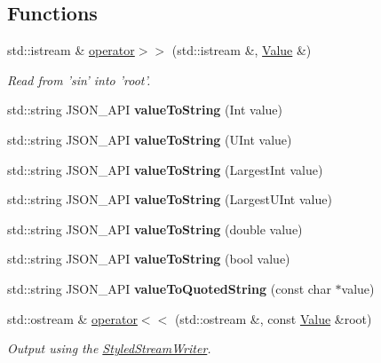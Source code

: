 \subsection*{Functions}
\begin{DoxyCompactItemize}
\item 
std\-::istream \& \hyperlink{namespace_json_a4d245ef719cc0853e8e78eb5f99c16e5}{operator$>$$>$} (std\-::istream \&, \hyperlink{class_json_1_1_value}{Value} \&)
\begin{DoxyCompactList}\small\item\em Read from 'sin' into 'root'. \end{DoxyCompactList}\item 
\hypertarget{namespace_json_a05cd078d8e086a4bcc08d40948f711e7}{std\-::string J\-S\-O\-N\-\_\-\-A\-P\-I {\bfseries value\-To\-String} (Int value)}\label{namespace_json_a05cd078d8e086a4bcc08d40948f711e7}

\item 
\hypertarget{namespace_json_abcb58ea0f384c30608729a94d539e2ce}{std\-::string J\-S\-O\-N\-\_\-\-A\-P\-I {\bfseries value\-To\-String} (U\-Int value)}\label{namespace_json_abcb58ea0f384c30608729a94d539e2ce}

\item 
\hypertarget{namespace_json_abd9c650f70d9434f98f9025e2e2faf2d}{std\-::string J\-S\-O\-N\-\_\-\-A\-P\-I {\bfseries value\-To\-String} (Largest\-Int value)}\label{namespace_json_abd9c650f70d9434f98f9025e2e2faf2d}

\item 
\hypertarget{namespace_json_a3f46b0bc62b95a9426a2da0117bdf9f0}{std\-::string J\-S\-O\-N\-\_\-\-A\-P\-I {\bfseries value\-To\-String} (Largest\-U\-Int value)}\label{namespace_json_a3f46b0bc62b95a9426a2da0117bdf9f0}

\item 
\hypertarget{namespace_json_a99995d7dafa4f4970b349d7d3c8d1d99}{std\-::string J\-S\-O\-N\-\_\-\-A\-P\-I {\bfseries value\-To\-String} (double value)}\label{namespace_json_a99995d7dafa4f4970b349d7d3c8d1d99}

\item 
\hypertarget{namespace_json_a979ed531f091985e22f0051cd2a8e341}{std\-::string J\-S\-O\-N\-\_\-\-A\-P\-I {\bfseries value\-To\-String} (bool value)}\label{namespace_json_a979ed531f091985e22f0051cd2a8e341}

\item 
\hypertarget{namespace_json_aa0c8235a4a5c6599da5d3332743db8ac}{std\-::string J\-S\-O\-N\-\_\-\-A\-P\-I {\bfseries value\-To\-Quoted\-String} (const char $\ast$value)}\label{namespace_json_aa0c8235a4a5c6599da5d3332743db8ac}

\item 
std\-::ostream \& \hyperlink{namespace_json_a87bc83d7e90fc666d28aa16727deda2f}{operator$<$$<$} (std\-::ostream \&, const \hyperlink{class_json_1_1_value}{Value} \&root)
\begin{DoxyCompactList}\small\item\em Output using the \hyperlink{class_json_1_1_styled_stream_writer}{Styled\-Stream\-Writer}. \end{DoxyCompactList}\end{DoxyCompactItemize}


